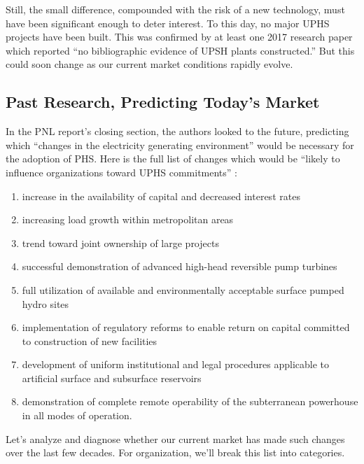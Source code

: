 \documentclass[hidelinks,12pt,a4paper]{article}
\begin{document}
Still, the small difference, compounded with the risk of a new technology, must have been significant enough to deter interest. To this day, no major UPHS projects have been built. This was confirmed by at least one 2017 research paper which reported “no bibliographic evidence of UPSH plants constructed.” \cite{UndergroundPumpedStorageHydropowerPlantsUsingOpenPitMines}
But this could soon change as our current market conditions rapidly evolve.

\subsection{Past Research, Predicting Today's Market}
In the PNL report's closing section, the authors looked to the future, predicting which “changes in the electricity generating environment” would be necessary for the adoption of PHS. Here is the full list of changes which would be “likely to influence organizations toward UPHS commitments” \cite{SubSurfacePumpedHydroelectricStorage}:

{\footnotesize
\begin{enumerate}
    \item increase in the availability of capital and decreased interest rates
    \item increasing load growth within metropolitan areas
    \item trend toward joint ownership of large projects
    \item successful demonstration of advanced high-head reversible pump turbines
    \item full utilization of available and environmentally acceptable surface pumped hydro sites
    \item implementation of regulatory reforms to enable return on capital committed to construction of new facilities
    \item development of uniform institutional and legal procedures applicable to artificial surface and subsurface reservoirs
    \item demonstration of complete remote operability of the subterranean powerhouse in all modes of operation.
\end{enumerate}
}

Let's analyze and diagnose whether our current market has made such changes over the last few decades. For organization, we'll break this list into categories.
\end{document}
